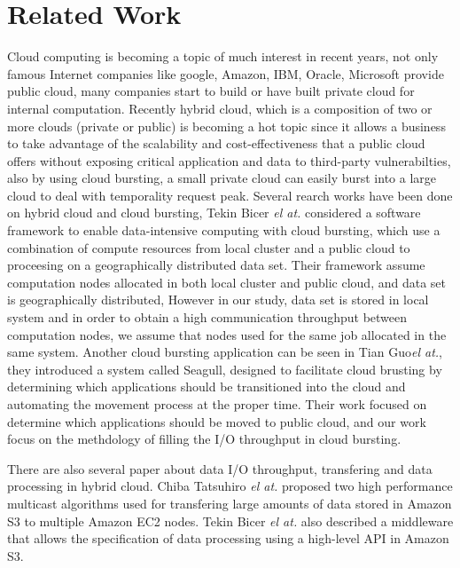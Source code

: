 \section{Related Work}
\label{sec:related_work}
Cloud computing is becoming a topic of much interest in recent years, not only famous Internet companies like google, Amazon, IBM, Oracle, Microsoft provide public cloud, many companies start to build or have built private cloud for internal computation. Recently hybrid cloud, which is a composition of two or more clouds (private or public) is becoming a hot topic since it allows a business to take advantage of the scalability and cost-effectiveness that a public cloud offers without exposing critical application and data to third-party vulnerabilties, also by using cloud bursting, a small private cloud can easily burst into a large cloud to deal with temporality request peak. 
Several rearch works have been done on hybrid cloud and cloud bursting, Tekin Bicer \emph{el at.}\cite{time_and_cost} considered a software framework to enable data-intensive computing with cloud bursting, which use a combination of compute resources from local cluster and a public cloud to proceesing on a geographically distributed data set.
Their framework assume computation nodes allocated in both local cluster and public cloud, and data set is geographically distributed, However in our study, data set is stored in local system and in order to obtain a high communication throughput between computation nodes, we assume that nodes used for the same job allocated in the same system.
Another cloud bursting application can be seen in Tian Guo\emph{el at.}\cite{Seagull}, they introduced a system called Seagull, designed to facilitate cloud brusting by determining which applications should be transitioned into the cloud and automating the movement process at the proper time. Their work focused on determine which applications should be moved to public cloud, and our work focus on the methdology of filling the I/O throughput in cloud bursting.

There are also several paper about data I/O throughput, transfering and data processing in hybrid cloud.
Chiba Tatsuhiro \emph{el at.}\cite{Chiba} proposed two high performance multicast algorithms used for transfering large amounts of data stored in Amazon S3 to multiple Amazon EC2 nodes.
Tekin Bicer \emph{el at.}\cite{MATE-EC2} also described a middleware that allows the specification of data processing using a high-level API in Amazon S3.
